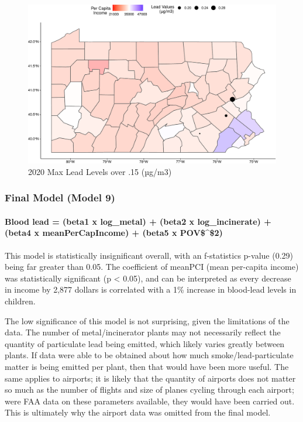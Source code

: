 \documentclass[
  12pt,
]{article}
\begin{document}
\begin{figure}

\includegraphics{Alcorn_Bao_Hermanson_ENV872_Project_files/figure-latex/spatial analysis 2020.3-1} \hfill{}

\caption{2020 Max Lead Levels over .15 (µg/m3)}\label{fig:spatial analysis 2020.3}
\end{figure}

\hypertarget{final-model-model-9}{%
\subsubsection{Final Model (Model 9)}\label{final-model-model-9}}

\hypertarget{blood-lead-beta1-x-log_metal-beta2-x-log_incinerate-beta4-x-meanpercapincome-beta5-x-pov2}{%
\paragraph{Blood lead = (beta1 x log\_metal) + (beta2 x log\_incinerate)
+ (beta4 x meanPerCapIncome) + (beta5 x
POV\$\^{}\$2)}\label{blood-lead-beta1-x-log_metal-beta2-x-log_incinerate-beta4-x-meanpercapincome-beta5-x-pov2}}

This model is statistically insignificant overall, with an f-statistics
p-value (0.29) being far greater than 0.05. The coefficient of meanPCI
(mean per-capita income) was statistically significant (p \textless{}
0.05), and can be interpreted as every decrease in income by 2,877
dollars is correlated with a 1\% increase in blood-lead levels in
children.

The low significance of this model is not surprising, given the
limitations of the data. The number of metal/incinerator plants may not
necessarily reflect the quantity of particulate lead being emitted,
which likely varies greatly between plants. If data were able to be
obtained about how much smoke/lead-particulate matter is being emitted
per plant, then that would have been more useful. The same applies to
airports; it is likely that the quantity of airports does not matter so
much as the number of flights and size of planes cycling through each
airport; were FAA data on these parameters available, they would have
been carried out. This is ultimately why the airport data was omitted
from the final model.
\end{document}
